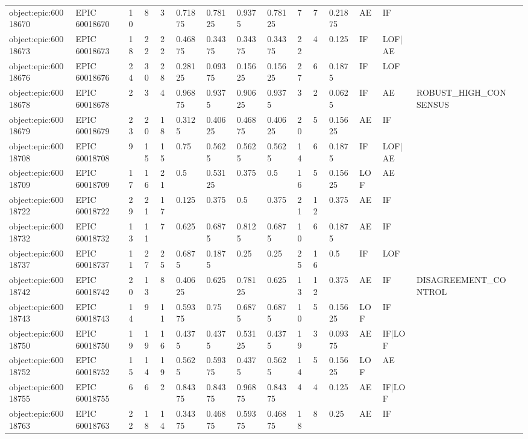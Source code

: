 \begin{longtable}{llllllllllllllll}
object:epic:60018670 & EPIC 60018670 & 10 & 8 & 3 & 0.71875 & 0.78125 & 0.9375 & 0.78125 & 7 & 7 & 0.21875 & AE & IF &  &  \\
object:epic:60018673 & EPIC 60018673 & 18 & 22 & 22 & 0.46875 & 0.34375 & 0.34375 & 0.34375 & 22 & 4 & 0.125 & IF & LOF|AE &  &  \\
object:epic:60018676 & EPIC 60018676 & 24 & 30 & 28 & 0.28125 & 0.09375 & 0.15625 & 0.15625 & 27 & 6 & 0.1875 & IF & LOF &  &  \\
object:epic:60018678 & EPIC 60018678 & 2 & 3 & 4 & 0.96875 & 0.9375 & 0.90625 & 0.9375 & 3 & 2 & 0.0625 & IF & AE & ROBUST\_HIGH\_CONSENSUS &  \\
object:epic:60018679 & EPIC 60018679 & 23 & 20 & 18 & 0.3125 & 0.40625 & 0.46875 & 0.40625 & 20 & 5 & 0.15625 & AE & IF &  &  \\
object:epic:60018708 & EPIC 60018708 & 9 & 15 & 15 & 0.75 & 0.5625 & 0.5625 & 0.5625 & 14 & 6 & 0.1875 & IF & LOF|AE &  &  \\
object:epic:60018709 & EPIC 60018709 & 17 & 16 & 21 & 0.5 & 0.53125 & 0.375 & 0.5 & 16 & 5 & 0.15625 & LOF & AE &  &  \\
object:epic:60018722 & EPIC 60018722 & 29 & 21 & 17 & 0.125 & 0.375 & 0.5 & 0.375 & 21 & 12 & 0.375 & AE & IF &  &  \\
object:epic:60018732 & EPIC 60018732 & 13 & 11 & 7 & 0.625 & 0.6875 & 0.8125 & 0.6875 & 10 & 6 & 0.1875 & AE & IF &  &  \\
object:epic:60018737 & EPIC 60018737 & 11 & 27 & 25 & 0.6875 & 0.1875 & 0.25 & 0.25 & 25 & 16 & 0.5 & IF & LOF &  &  \\
object:epic:60018742 & EPIC 60018742 & 20 & 13 & 8 & 0.40625 & 0.625 & 0.78125 & 0.625 & 13 & 12 & 0.375 & AE & IF & DISAGREEMENT\_CONTROL &  \\
object:epic:60018743 & EPIC 60018743 & 14 & 9 & 11 & 0.59375 & 0.75 & 0.6875 & 0.6875 & 10 & 5 & 0.15625 & LOF & IF &  &  \\
object:epic:60018750 & EPIC 60018750 & 19 & 19 & 16 & 0.4375 & 0.4375 & 0.53125 & 0.4375 & 19 & 3 & 0.09375 & AE & IF|LOF &  &  \\
object:epic:60018752 & EPIC 60018752 & 15 & 14 & 19 & 0.5625 & 0.59375 & 0.4375 & 0.5625 & 14 & 5 & 0.15625 & LOF & AE &  &  \\
object:epic:60018755 & EPIC 60018755 & 6 & 6 & 2 & 0.84375 & 0.84375 & 0.96875 & 0.84375 & 4 & 4 & 0.125 & AE & IF|LOF &  &  \\
object:epic:60018763 & EPIC 60018763 & 22 & 18 & 14 & 0.34375 & 0.46875 & 0.59375 & 0.46875 & 18 & 8 & 0.25 & AE & IF &  &  \\

\end{longtable}
